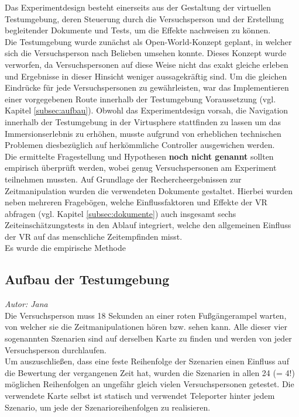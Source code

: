 \documentclass{Bericht}
\begin{document}
Das Experimentdesign besteht einerseits aus der Gestaltung der virtuellen Testumgebung, deren Steuerung durch die Versuchsperson und der Erstellung begleitender Dokumente und Tests, um die Effekte nachweisen zu können.\\
Die Testumgebung wurde zunächst als Open-World-Konzept geplant, in welcher sich die Versuchsperson nach Belieben umsehen konnte. Dieses Konzept wurde verworfen, da Versuchspersonen auf diese Weise nicht das exakt gleiche erleben und Ergebnisse in dieser Hinsicht weniger aussagekräftig sind. Um die gleichen Eindrücke für jede Versuchspersonen zu gewährleisten, war das Implementieren einer vorgegebenen Route innerhalb der Testumgebung Voraussetzung (vgl. Kapitel \ref{subsec:aufbau}).
	Obwohl das Experimentdesign vorsah, die Navigation innerhalb der Testumgebung in der Virtusphere stattfinden zu lassen um das Immersionserlebnis zu erhöhen, musste aufgrund von erheblichen technischen Problemen diesbezüglich auf herkömmliche Controller ausgewichen werden.\\
	Die ermittelte Fragestellung und Hypothesen \textbf{noch nicht genannt} sollten empirisch überprüft werden, wobei genug Versuchspersonen am Experiment teilnehmen mussten.
Auf Grundlage der Rechercheergebnissen zur  Zeitmanipulation wurden die verwendeten Dokumente gestaltet. Hierbei wurden neben mehreren Fragebögen, welche Einflussfaktoren und Effekte der VR abfragen		 (vgl. Kapitel \ref{subsec:dokumente}) auch insgesamt sechs Zeiteinschätzungstests in den Ablauf integriert, welche den allgemeinen Einfluss der VR auf das menschliche Zeitempfinden misst.\\
Es wurde die empirische Methode
	

\subsection{Aufbau der Testumgebung}
\textit{Autor: Jana}\\
	 
  Die Versuchsperson muss 18 Sekunden an einer roten Fußgängerampel warten, von welcher sie die Zeitmanipulationen hören bzw. sehen kann.
Alle dieser vier sogenannten Szenarien sind auf derselben Karte zu finden und werden von jeder Versuchsperson durchlaufen.\\
Um auszuschließen, dass eine feste Reihenfolge der Szenarien einen Einfluss auf die Bewertung der vergangenen Zeit hat, wurden die Szenarien in allen 24 (= 4!) möglichen Reihenfolgen an ungefähr gleich vielen Versuchspersonen getestet. Die verwendete Karte selbst ist statisch und verwendet Teleporter hinter jedem Szenario, um jede der Szenarioreihenfolgen zu realisieren.
\end{document}
